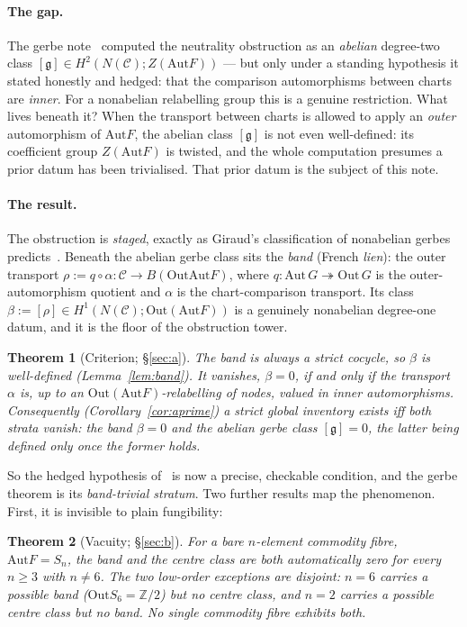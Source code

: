 \documentclass[11pt]{article}
\newtheorem{theorem}{Theorem}
\theoremstyle{definition}
\newcommand{\C}{\mathcal{C}}
\newcommand{\Z}{\mathbb{Z}}
\newcommand{\Aut}{\mathrm{Aut}}
\newcommand{\Out}{\mathrm{Out}}
\newcommand{\gerbe}{\mathfrak{g}}
\begin{document}
\paragraph{The gap.} The gerbe note~\cite{gerbenote} computed the neutrality obstruction as an
\emph{abelian} degree-two class $[\gerbe]\in H^2(N(\C);Z(\Aut F))$ --- but only under a standing
hypothesis it stated honestly and hedged: that the comparison automorphisms between charts are
\emph{inner}. For a nonabelian relabelling group this is a genuine restriction. What lives beneath it?
When the transport between charts is allowed to apply an \emph{outer} automorphism of $\Aut F$, the
abelian class $[\gerbe]$ is not even well-defined: its coefficient group $Z(\Aut F)$ is twisted, and
the whole computation presumes a prior datum has been trivialised. That prior datum is the subject of
this note.

\paragraph{The result.} The obstruction is \emph{staged}, exactly as Giraud's classification of
nonabelian gerbes predicts~\cite{giraud}. Beneath the abelian gerbe class sits the \emph{band} (French
\emph{lien}): the outer transport $\rho:=q\circ\alpha:\C\to B(\Out\Aut F)$, where
$q:\Aut\,G\twoheadrightarrow\Out\,G$ is the outer-automorphism quotient and $\alpha$ is the
chart-comparison transport. Its class $\beta:=[\rho]\in H^1(N(\C);\Out(\Aut F))$ is a genuinely
nonabelian degree-one datum, and it is the floor of the obstruction tower.

\begin{theorem}[Criterion; \S\ref{sec:a}]\label{thm:a-intro}
The band is always a strict cocycle, so $\beta$ is well-defined \emph{(Lemma~\ref{lem:band})}. It
vanishes, $\beta=0$, if and only if the transport $\alpha$ is, up to an $\Out(\Aut F)$-relabelling of
nodes, valued in inner automorphisms. Consequently \emph{(Corollary~\ref{cor:aprime})} a strict global
inventory exists iff both strata vanish: the band $\beta=0$ \emph{and} the abelian gerbe class
$[\gerbe]=0$, the latter being defined only once the former holds.
\end{theorem}

So the hedged hypothesis of~\cite{gerbenote} is now a precise, checkable condition, and the gerbe
theorem is its \emph{band-trivial stratum}. Two further results map the phenomenon. First, it is
invisible to plain fungibility:

\begin{theorem}[Vacuity; \S\ref{sec:b}]\label{thm:b-intro}
For a bare $n$-element commodity fibre, $\Aut F=S_n$, the band \emph{and} the centre class are both
automatically zero for every $n\ge 3$ with $n\neq 6$. The two low-order exceptions are disjoint:
$n=6$ carries a possible band ($\Out S_6=\Z/2$) but no centre class, and $n=2$ carries a possible
centre class but no band. No single commodity fibre exhibits both.
\end{theorem}
\end{document}
